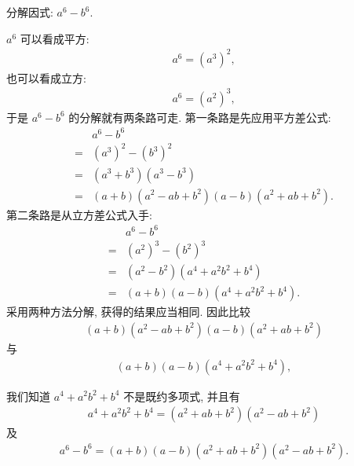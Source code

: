 \begin{example}
	分解因式: $a^6-b^6$.
\end{example}
\begin{solution}
	$a^6$ 可以看成平方:
	\begin{align*}
		a^6=\left(a^3\right)^2,
	\end{align*}
	也可以看成立方:
	\begin{align*}
		a^6=\left(a^2\right)^3,
	\end{align*}
	于是 $a^6-b^6$ 的分解就有两条路可走.
	第一条路是先应用平方差公式:
	\begin{align*}
		  & a^6-b^6                                                      \\
		= & \left(a^3\right)^2-\left(b^3\right)^2                        \\
		= & \left(a^3+b^3\right)\left(a^3-b^3\right)                     \\
		= & (a+b)\left(a^2-a b+b^2\right)(a-b)\left(a^2+a b+b^2\right) .
	\end{align*}
	第二条路是从立方差公式入手:
	\begin{align*}
		  & a^6-b^6                                          \\
		= & \left(a^2\right)^3-\left(b^2\right)^3            \\
		= & \left(a^2-b^2\right)\left(a^4+a^2 b^2+b^4\right) \\
		= & (a+b)(a-b)\left(a^4+a^2 b^2+b^4\right) .
	\end{align*}
	采用两种方法分解, 获得的结果应当相同. 因此比较
	\begin{align*}
		(a+b)\left(a^2-a b+b^2\right)(a-b)\left(a^2+a b+b^2\right)
	\end{align*}
	与
	\begin{align*}
		(a+b)(a-b)\left(a^4+a^2 b^2+b^4\right),
	\end{align*}

	我们知道 $a^4+a^2 b^2+b^4$ 不是既约多项式, 并且有
	\begin{align*}
		a^4+a^2 b^2+b^4=\left(a^2+a b+b^2\right)\left(a^2-a b+b^2\right)
	\end{align*}
	及
	\begin{align*}
		a^6-b^6=(a+b)(a-b)\left(a^2+a b+b^2\right)\left(a^2-a b+b^2\right) .
	\end{align*}
\end{solution}


